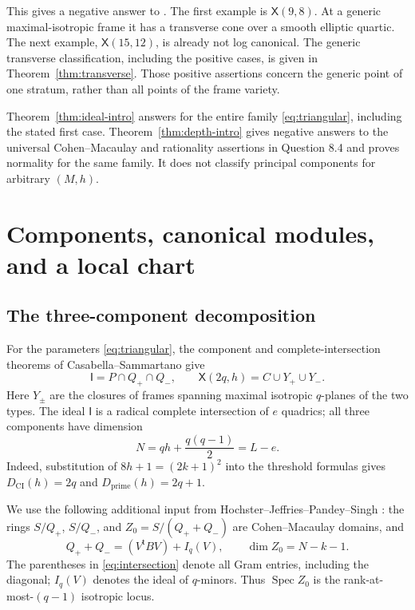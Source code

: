 \documentclass[11pt]{article}
\theoremstyle{definition}
\theoremstyle{remark}
\numberwithin{equation}{section}
\DeclareMathOperator{\Spec}{Spec}
\newcommand{\XX}{\mathsf X}
\newcommand{\II}{\mathsf I}
\newcommand{\Dpr}{D_{\mathrm{prime}}}
\newcommand{\DCI}{D_{\mathrm{CI}}}
\begin{document}
This gives a negative answer to \cite[Question 8.1]{CS}. The first
example is $\XX(9,8)$. At a generic maximal-isotropic frame it has a
transverse cone over a smooth elliptic quartic. The next example,
$\XX(15,12)$, is already not log canonical. The generic transverse
classification, including the positive cases, is given in
Theorem~\ref{thm:transverse}. Those positive assertions concern the
generic point of one stratum, rather than all points of the frame
variety.

Theorem~\ref{thm:ideal-intro} answers \cite[Question 8.3]{CS} for the
entire family \eqref{eq:triangular}, including the stated first case.
Theorem~\ref{thm:depth-intro} gives negative answers to the universal
Cohen--Macaulay and rationality assertions in Question 8.4 and proves
normality for the same family. It does not classify principal components
for arbitrary $(M,h)$.

\section{Components, canonical modules, and a local chart}\label{sec:prelim}

\subsection{The three-component decomposition}

For the parameters \eqref{eq:triangular}, the component and
complete-intersection theorems of Casabella--Sammartano
\cite[Theorems 1 and 5.8]{CS} give
\begin{equation}\label{eq:three-components}
 \II=P\cap Q_+\cap Q_-,\qquad
 \XX(2q,h)=C\cup Y_+\cup Y_-.
\end{equation}
Here $Y_\pm$ are the closures of frames spanning maximal isotropic
$q$-planes of the two types. The ideal $\II$ is a radical complete
intersection of $e$ quadrics; all three components have dimension
\begin{equation}\label{eq:dimension-N}
 N=qh+\frac{q(q-1)}2=L-e.
\end{equation}
Indeed, substitution of $8h+1=(2k+1)^2$ into the threshold formulas
gives $\DCI(h)=2q$ and $\Dpr(h)=2q+1$.

We use the following additional input from
Hochster--Jeffries--Pandey--Singh \cite[Theorem 7.13]{HJPS}:
the rings $S/Q_+$, $S/Q_-$, and $Z_0=S/(Q_++Q_-)$ are
Cohen--Macaulay domains, and
\begin{equation}\label{eq:intersection}
 Q_++Q_-=(V^{\mathsf t}BV)+I_q(V),\qquad
 \dim Z_0=N-k-1.
\end{equation}
The parentheses in \eqref{eq:intersection} denote all Gram entries,
including the diagonal; $I_q(V)$ denotes the ideal of $q$-minors.
Thus $\Spec Z_0$ is the rank-at-most-$(q-1)$ isotropic locus.
\end{document}
